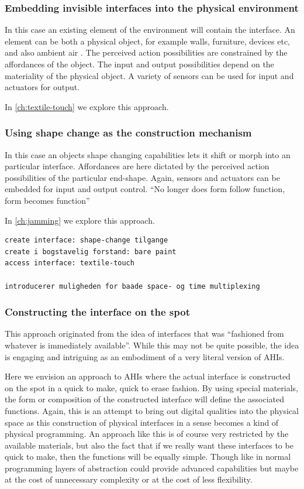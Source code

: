 \subsubsection{Embedding invisible interfaces into the physical environment}

In this case an existing element of the environment will contain the interface.
An element can be both a physical object, for example walls, furniture, devices etc, and also ambient air .
The perceived action possibilities are constrained by the affordances of the object. 
The input and output possibilities depend on the materiality of the physical object.
A variety of sensors can be used for input and actuators for output.

In \autoref{ch:textile-touch} we explore this approach.

\subsubsection{Using shape change as the construction mechanism}

In this case an objects shape changing capabilities lets it shift or morph into an particular interface.
Affordances are here dictated by the perceived action possibilities of the particular end-shape.
Again, sensors and actuators can be embedded for input and output control.
``No longer does form follow function, form becomes function''

In \autoref{ch:jamming} we explore this approach.

\begin{verbatim}
create interface: shape-change tilgange
create i bogstavelig forstand: bare paint
access interface: textile-touch

introducerer muligheden for baade space- og time multiplexing
\end{verbatim}

\subsubsection{Constructing the interface on the spot}
This approach originated from the idea of interfaces that was ``fashioned from whatever is immediately available''.
While this may not be quite possible, the idea is engaging and intriguing as an embodiment of a very literal version of AHIs.

Here we envision an approach to AHIs where the actual interface is constructed on the spot in a quick to make, quick to erase fashion.
By using special materials, the form or composition of the constructed interface will define the associated functions.
Again, this is an attempt to bring out digital qualities into the physical space as this construction of physical interfaces in a sense becomes a kind of physical programming.
An approach like this is of course very restricted by the available materials, but also the fact that if we really want these interfaces to be quick to make, then the functions will be equally simple.
Though like in normal programming layers of abstraction could provide advanced capabilities but maybe at the cost of unnecessary complexity or at the cost of less flexibility.

